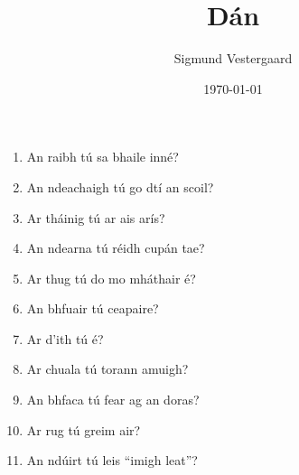 \documentclass[article,a4paper,oneside,12pt]{memoir}
\title{{ \bfseries Dán }}
\author{Sigmund Vestergaard}
\date{\today}
\begin{document}
\maketitle

\begin{enumerate}
  \item An raibh tú sa bhaile inn\'{e}?
  \item An ndeachaigh tú go dtí an scoil?
  \item Ar tháinig tú ar ais arís?
  \item An ndearna tú r\'{e}idh cupán tae?
  \item Ar thug tú do mo mháthair \'{e}?
  \item An bhfuair tú ceapaire?
  \item Ar d'ith tú \'{e}?
  \item Ar chuala tú torann amuigh?
  \item An bhfaca tú fear ag an doras?
  \item Ar rug tú greim air?
  \item An ndúirt tú leis ``imigh leat''?
\end{enumerate}
\end{document}
